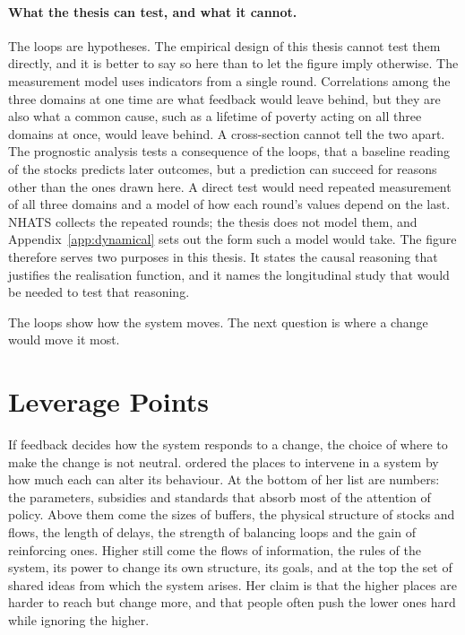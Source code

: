 \paragraph{What the thesis can test, and what it cannot.} The loops are
hypotheses. The empirical design of this thesis cannot test them directly, and
it is better to say so here than to let the figure imply otherwise. The
measurement model uses indicators from a single round. Correlations among the
three domains at one time are what feedback would leave behind, but they are
also what a common cause, such as a lifetime of poverty acting on all three
domains at once, would leave behind. A cross-section cannot tell the two
apart. The prognostic analysis tests a consequence of the loops, that a
baseline reading of the stocks predicts later outcomes, but a prediction can
succeed for reasons other than the ones drawn here. A direct test would need
repeated measurement of all three domains and a model of how each round's
values depend on the last. NHATS collects the repeated rounds; the thesis does
not model them, and Appendix~\ref{app:dynamical} sets out the form such a
model would take. The figure therefore serves two purposes in this thesis. It
states the causal reasoning that justifies the realisation function, and it
names the longitudinal study that would be needed to test that reasoning.

The loops show how the system moves. The next question is where a change
would move it most.

\section{Leverage Points}
\label{sec:sys-leverage}

If feedback decides how the system responds to a change, the choice of where
to make the change is not neutral. \citet{meadows_1999} ordered the places to
intervene in a system by how much each can alter its behaviour. At the bottom
of her list are numbers: the parameters, subsidies and standards that absorb
most of the attention of policy. Above them come the sizes of buffers, the
physical structure of stocks and flows, the length of delays, the strength of
balancing loops and the gain of reinforcing ones. Higher still come the flows
of information, the rules of the system, its power to change its own
structure, its goals, and at the top the set of shared ideas from which the
system arises. Her claim is that the higher places are harder to reach but
change more, and that people often push the lower ones hard while ignoring the
higher.

